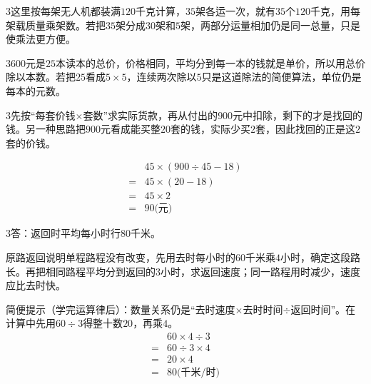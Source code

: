 \documentclass[multi=snippet,border={5bp 20bp 5bp 5bp}]{standalone}
\newenvironment{snippet}[3]{\begin{minipage}{#1bp}\color{answerred}\fontsize{#2}{#3}\selectfont\raggedright}{\end{minipage}}
\begin{document}
\begin{snippet}{505}{11.5}{14}\begin{multicols}{3}\raggedcolumns 这里按每架无人机都装满\(120\)\allowbreak 千克计算，\(35\)\allowbreak 架各运一次，就有\(35\)\allowbreak 个\(120\)\allowbreak 千克，用每架载质量乘架数。若把\(35\)\allowbreak 架分成\(30\)\allowbreak 架和\(5\)\allowbreak 架，两部分运量相加仍是同一总量，只是使乘法更方便。\end{multicols}\end{snippet}
\begin{snippet}{505}{11.5}{14}\begin{multicols}{3}\raggedcolumns \(600\)\allowbreak 元是\(25\)\allowbreak 本读本的总价，价格相同，平均分到每一本的钱就是单价，所以用总价除以本数。若把\(25\)\allowbreak 看成\(5\times5\)\allowbreak ，连续两次除以\(5\)\allowbreak 只是这道除法的简便算法，单位仍是每本的元数。\end{multicols}\end{snippet}
\begin{snippet}{505}{11.5}{14}\begin{multicols}{3}\raggedcolumns 先按“每套价钱\(\times\)\allowbreak 套数”求实际货款，再从付出的\(900\)\allowbreak 元中扣除，剩下的才是找回的钱。另一种思路把\(900\)\allowbreak 元看成能买整\(20\)\allowbreak 套的钱，实际少买\(2\)\allowbreak 套，因此找回的正是这\(2\)\allowbreak 套的价钱。\par \[\begin{aligned}&45\times(900\div45-18)\\={}&45\times(20-18)\\={}&45\times2\\={}&90\text{(元)}\end{aligned}\]\end{multicols}\end{snippet}
\begin{snippet}{505}{11.5}{14}\begin{multicols}{3}\raggedcolumns 答：返回时平均每小时行80千米。\par 原路返回说明单程路程没有改变，先用去时每小时的\(60\)\allowbreak 千米乘\(4\)\allowbreak 小时，确定这段路长。再把相同路程平均分到返回的\(3\)\allowbreak 小时，求返回速度；同一路程用时减少，速度应比去时快。\par 简便提示（学完运算律后）：数量关系仍是“去时速度\(\times\)\allowbreak 去时时间\(\div\)\allowbreak 返回时间”。在计算中先用\(60\div3\)\allowbreak 得整十数\(20\)\allowbreak ，再乘\(4\)\allowbreak 。\[\begin{aligned}&60\times4\div3\\={}&60\div3\times4\\={}&20\times4\\={}&80\text{(千米/时)}\end{aligned}\]\end{multicols}\end{snippet}
\end{document}
